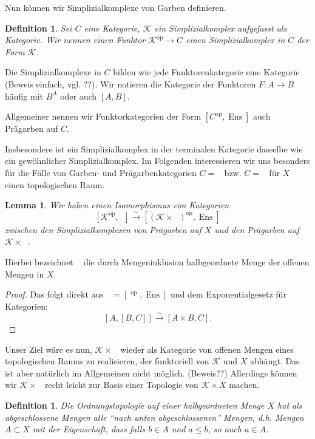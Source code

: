 \documentclass[a4paper]{article}
\newtheorem{lemma}[theorem]{Lemma}
\newtheorem{defn}[theorem]{Definition}
\DeclareMathOperator{\EnsX}{Ens_{/X}}
\DeclareMathOperator{\pEnsX}{pEns_{/X}}
\DeclareMathOperator{\OffX}{Off_X}
\DeclareMathOperator{\Ens}{Ens}
\newcommand{\op}{\mathrm{op}}
\newcommand{\iso}{\xrightarrow{\sim}}
\begin{document}
Nun können wir Simplizialkomplexe von Garben definieren.

\begin{defn}
  Sei $C$ eine Kategorie, $\mathcal{K}$ ein Simplizialkomplex
  aufgefasst als Kategorie. Wir nennen einen Funktor $\mathcal{K}^\op \to
  C$ einen Simplizialkomplex in $C$ der Form $\mathcal{K}$.
\end{defn}

Die Simplizialkomplexe in $C$ bilden wie jede Funktorenkategorie eine
Kategorie (Beweis einfach, vgl. ??). Wir notieren die Kategorie der
Funktoren $F: A \to B$ häufig mit $B^A$ oder auch $[A, B]$.

Allgemeiner nennen wir Funktorkategorien der Form $[C^\op, \Ens]$ auch
Prägarben auf $C$.

Insbesondere ist ein Simplizialkomplex in der terminalen Kategorie
dasselbe wie ein gewöhnlicher Simplizialkomplex. Im Folgenden
interessieren wir uns besonders für die Fälle von Garben- und
Prägarbenkategorien $C = \EnsX$ bzw. $C = \pEnsX$ für $X$ einen
topologischen Raum.

\begin{lemma}
  Wir haben einen Isomorphismus von Kategorien
  \[
    [\mathcal{K}^\op, \pEnsX] \iso [(\mathcal{K} \times \OffX)^\op, \Ens]
  \]    
  zwischen den Simplizialkomplexen von Prägarben auf $X$ und den
  Prägarben auf $\mathcal{K} \times \OffX$.
\end{lemma}

Hierbei bezeichnet $\OffX$ die durch Mengeninklusion halbgeordnete
Menge der offenen Mengen in $X$.

\begin{proof}
  Das folgt direkt aus $\pEnsX = [\OffX^\op, \Ens]$ und dem
  Exponentialgesetz für Kategorien:
  \[ [A, [B, C]] \iso [A \times B, C]. \]
\end{proof}

Unser Ziel wäre es nun, $\mathcal{K} \times \OffX$ wieder als
Kategorie von offenen Mengen eines topologischen Raums zu realisieren,
der funktoriell von $\mathcal{K}$ und $X$ abhängt. Das ist aber
natürlich im Allgemeinen nicht möglich. (Beweis??) Allerdings können
wir $\mathcal{K} \times \OffX$ recht leicht zur Basis einer Topologie
von $\mathcal{K} \times X$ machen.

\begin{defn}
  Die Ordnungstopologie auf einer halbgeordneten Menge $X$ hat als
  abgeschlossene Mengen alle ``nach unten abgeschlossenen'' Mengen,
  d.h. Mengen $A \subset X$ mit der Eigenschaft, dass falls $b \in A$
  und $a \leq b$, so auch $a \in A$.
\end{defn}
\end{document}
